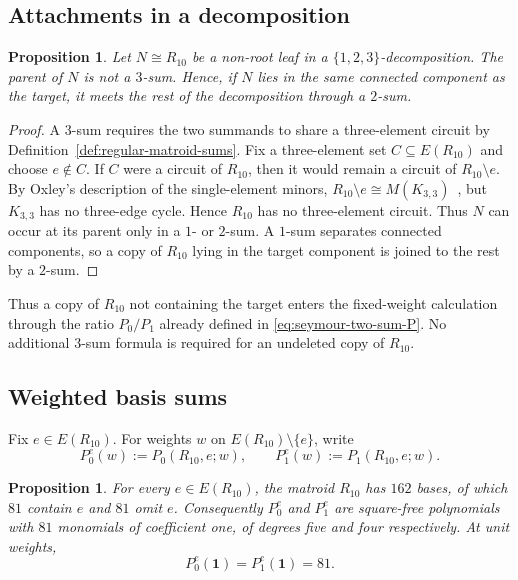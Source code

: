 \documentclass[11pt]{article}
\numberwithin{equation}{section}
\newtheorem{proposition}[definition]{Proposition}
\theoremstyle{remark}
\begin{document}
\subsection{Attachments in a decomposition}
\label{subsec:r10-attachments}

\begin{proposition}
\label{prop:r10-no-three-sum}
Let $N\cong R_{10}$ be a non-root leaf in a $\{1,2,3\}$-decomposition.  The parent of
$N$ is not a $3$-sum.  Hence, if $N$ lies in the same connected component as
the target, it meets the rest of the decomposition through a $2$-sum.
\end{proposition}

\begin{proof}
A $3$-sum requires the two summands to share a three-element circuit by
Definition~\ref{def:regular-matroid-sums}. Fix a three-element set
$C\subseteq E(R_{10})$ and choose $e\notin C$. If $C$ were a circuit of
$R_{10}$, then it would remain a circuit of $R_{10}\setminus e$. By
Oxley's description of the single-element minors,
$R_{10}\setminus e\cong M(K_{3,3})$~\cite[Lem.~6.6.9]{Oxley2011}, but
$K_{3,3}$ has no three-edge cycle. Hence $R_{10}$ has no three-element
circuit. Thus $N$ can occur at its parent only in a $1$- or $2$-sum. A
$1$-sum separates connected components, so a copy of $R_{10}$ lying in the
target component is joined to the rest by a $2$-sum.
\end{proof}

Thus a copy of $R_{10}$ not containing the target enters the fixed-weight calculation
through the ratio $P_0/P_1$ already defined in
\eqref{eq:seymour-two-sum-P}.  No additional $3$-sum formula is required for
an undeleted copy of $R_{10}$.

\subsection{Weighted basis sums}
\label{subsec:r10-weighted-bases}

Fix $e\in E(R_{10})$.  For weights $w$ on $E(R_{10})\setminus\{e\}$, write
\begin{equation}
    P_0^e(w):=P_0(R_{10},e;w),
    \qquad
    P_1^e(w):=P_1(R_{10},e;w).
    \label{eq:r10-P01}
\end{equation}

\begin{proposition}
\label{prop:r10-basis-polynomials}
For every $e\in E(R_{10})$, the matroid $R_{10}$ has $162$ bases, of which
$81$ contain $e$ and $81$ omit $e$.  Consequently $P_0^e$ and $P_1^e$ are
square-free polynomials with $81$ monomials of coefficient one, of degrees
five and four respectively.  At unit weights,
\begin{equation}
    P_0^e(\mathbf 1)=P_1^e(\mathbf 1)=81.
    \label{eq:r10-unit-P01}
\end{equation}
\end{proposition}
\end{document}
